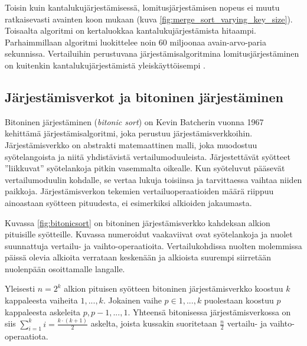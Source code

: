 \documentclass[a4paper,11pt]{article}
\newcommand{\engl}[1]{\foreignlanguage{english}{\em #1}}
\begin{document}
Toisin kuin kantalukujärjestämisessä, lomitusjärjestämisen nopeus ei muutu ratkaisevasti avainten koon mukaan (kuva \ref{fig:merge_sort_varying_key_size}). Toisaalta algoritmi on kertaluokkaa kantalukujärjestämista hitaampi. Parhaimmillaan algoritmi luokittelee noin 60 miljoonaa avain-arvo-paria sekunnissa. Vertailuihin perustuvana järjestämisalgoritmina lomitusjärjestäminen on kuitenkin kantalukujärjestämistä yleiskäyttöisempi \cite{clrs}.

\subsection{Järjestämisverkot ja bitoninen järjestäminen}

Bitoninen järjestäminen (\engl{bitonic sort}) on Kevin Batcherin vuonna 1967 kehittämä järjestämisalgoritmi, joka perustuu järjestämisverkkoihin. Järjestämisverkko on abstrakti matemaattinen malli, joka muodostuu syötelangoista ja niitä yhdistävistä vertailumoduuleista. Järjestettävät syötteet ''liikkuvat'' syötelankoja pitkin vasemmalta oikealle. Kun syöteluvut pääsevät vertailumoduulin kohdalle, se vertaa lukuja toisiinsa ja tarvittaessa vaihtaa niiden paikkoja. Järjestämisverkon tekemien vertailuoperaatioiden määrä riippuu ainoastaan syötteen pituudesta, ei esimerkiksi alkioiden jakaumasta.

Kuvassa \ref{fig:bitonicsort} on bitoninen järjestämisverkko kahdeksan alkion pituisille syötteille. Kuvassa numeroidut vaakaviivat ovat syötelankoja ja nuolet suunnattuja vertailu- ja vaihto-operaatioita. Vertailukohdissa nuolten molemmissa päissä olevia alkioita verrataan keskenään ja alkioista suurempi siirretään nuolenpään osoittamalle langalle.

Yleisesti $n = 2^k$ alkion pituisen syötteen bitoninen järjestämisverkko koostuu $k$ kappaleesta vaiheita $1,...,k$. Jokainen vaihe $p \in 1,...,k$ puolestaan koostuu $p$ kappaleesta askeleita $p, p-1, ..., 1$. Yhteensä bitonisessa järjestämisverkossa on siis $\sum_{i = 1}^k i = \frac{k \cdot (k + 1)}{2}$ askelta, joista kussakin suoritetaan $\frac{n}{2}$ vertailu- ja vaihto-o\-pe\-raa\-ti\-o\-ta.
\end{document}
